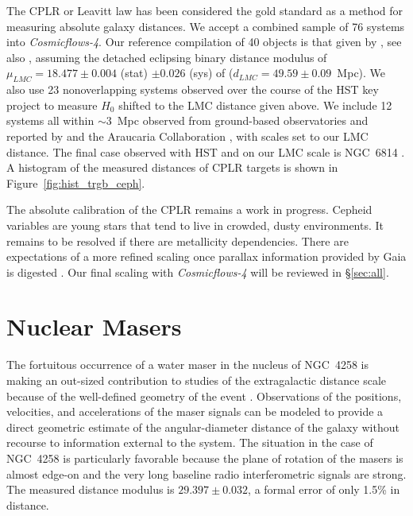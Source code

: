 \documentclass[twocolumn]{aastex63}
\begin{document}
The CPLR or Leavitt law \citep{1912HarCi.173....1L} has been considered the gold standard as a method for measuring absolute galaxy distances.  We accept a combined sample of 76 systems into {\it Cosmicflows-4}.  Our reference compilation of 40 objects is that given by \citet{2016ApJ...826...56R, 2019ApJ...876...85R, 2022ApJ...934L...7R}, see also \citet{2020ApJ...902...26Y,2021ApJ...913....3Y}, assuming the detached eclipsing binary distance modulus of $\mu_{LMC} = 18.477\pm0.004$ (stat) $\pm0.026$ (sys) of \citet{2019Natur.567..200P} ($d_{LMC} = 49.59\pm0.09$~Mpc).  We also use 23 nonoverlapping systems observed over the course of the HST key project to measure $H_0$ \citep{2001ApJ...553...47F} shifted to the LMC distance given above.  We include 12 systems all within $\sim 3$~Mpc observed from ground-based observatories and reported by \citet{2016AJ....151...88B} and the Araucaria Collaboration \citep{2017ApJ...847...88Z}, with scales set to our LMC distance.  The final case observed with HST and on our LMC scale is NGC~6814 \citep{2019ApJ...885..161B}.  A histogram of the measured distances of CPLR targets is shown in Figure~\ref{fig:hist_trgb_ceph}.

The absolute calibration of the CPLR remains a work in progress.  Cepheid variables are young stars that tend to live in crowded, dusty environments.  It remains to be resolved if there are metallicity dependencies.  There are expectations of a more refined scaling once parallax information provided by Gaia is digested \citep{2021ApJ...908L...6R}.  Our final scaling with {\it Cosmicflows-4} will be reviewed in \S \ref{sec:all}.


\section{Nuclear Masers}
\label{sec:maser}

The fortuitous occurrence of a water maser in the nucleus of NGC~4258 is making an out-sized contribution to studies of the extragalactic distance scale because of the well-defined geometry of the event \citep{2013ApJ...775...13H, 2019ApJ...886L..27R}.  Observations of the positions, velocities, and accelerations of the maser signals can be modeled to provide a direct geometric estimate of the angular-diameter distance of the galaxy without recourse to information external to the system.  The situation in the case of NGC~4258 is particularly favorable because the plane of rotation of the masers is almost edge-on and the very long baseline radio interferometric signals are strong.  The measured distance modulus is $29.397\pm0.032$, a formal error of only 1.5\% in distance. 
\end{document}
